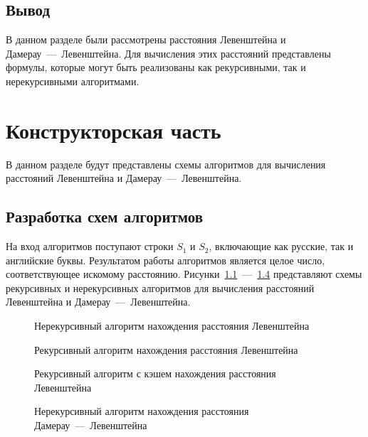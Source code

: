 \documentclass[a4paper, 12pt]{extreport}
\begin{document}
\section*{Вывод}
В данном разделе были рассмотрены расстояния Левенштейна и Дамерау~---~Левенштейна. Для вычисления этих расстояний представлены формулы, которые могут быть реализованы как рекурсивными, так и нерекурсивными алгоритмами.


\chapter{Конструкторская часть}
В данном разделе будут представлены схемы алгоритмов для вычисления расстояний Левенштейна и Дамерау~---~Левенштейна.

\section{Разработка схем алгоритмов}

На вход алгоритмов поступают строки $S_{1}$ и $S_{2}$, включающие как русские, так и английские буквы. Результатом работы алгоритмов является целое число, соответствующее искомому расстоянию.
Рисунки~\ref{fig:lev_matr}~---~\ref{fig:dam_lev} представляют схемы рекурсивных и нерекурсивных алгоритмов для вычисления расстояний Левенштейна и Дамерау~---~Левенштейна.
\clearpage

\begin{figure}[h]
    \centering
     
    \caption{Нерекурсивный алгоритм нахождения расстояния Левенштейна}
    \label{fig:lev_matr}
\end{figure}

\clearpage

\begin{figure}[h]
	\centering
	
	\caption{Рекурсивный алгоритм нахождения расстояния Левенштейна}
	\label{fig:lev_rec}
\end{figure}

\clearpage  

\begin{figure}[h]
	\centering
	
	\caption{Рекурсивный алгоритм с кэшем нахождения расстояния Левенштейна}
	\label{fig:lev_rec_cache}
\end{figure}

\clearpage

\begin{figure}[h]
    \centering
    
    \caption{Нерекурсивный алгоритм нахождения расстояния Дамерау~---~Левенштейна}
    \label{fig:dam_lev}
\end{figure}
\end{document}
